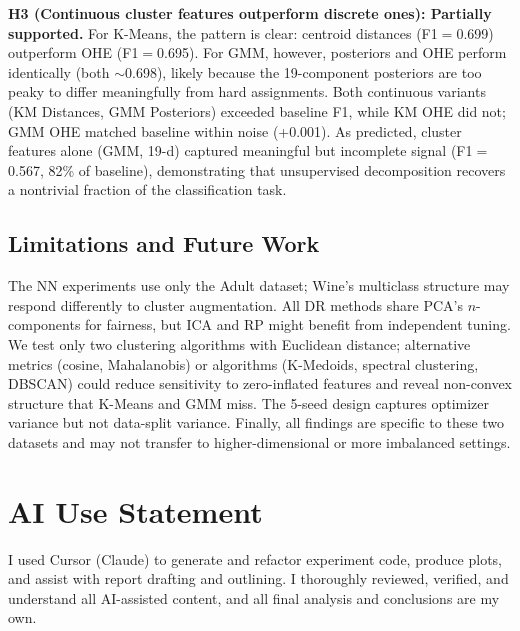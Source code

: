 \documentclass[conference]{IEEEtran}
\begin{document}
\textbf{H3 (Continuous cluster features outperform discrete ones):
Partially supported.} For K-Means, the pattern is clear: centroid
distances (F1$=$0.699) outperform OHE (F1$=$0.695). For GMM, however,
posteriors and OHE perform identically (both $\sim$0.698), likely
because the 19-component posteriors are too peaky to differ
meaningfully from hard assignments. Both continuous variants (KM
Distances, GMM Posteriors) exceeded baseline F1, while KM OHE did
not; GMM OHE matched baseline within noise (+0.001). As predicted,
cluster features alone (GMM, 19-d) captured meaningful but incomplete
signal (F1$=$0.567, 82\% of baseline), demonstrating that
unsupervised decomposition recovers a nontrivial fraction of the
classification task.

\subsection{Limitations and Future Work}

The NN experiments use only the Adult dataset; Wine's multiclass
structure may respond differently to cluster augmentation. All DR
methods share PCA's $n$-components for fairness, but ICA and RP might
benefit from independent tuning. We test only two clustering algorithms with Euclidean distance;
alternative metrics (cosine, Mahalanobis) or algorithms (K-Medoids,
spectral clustering, DBSCAN) could reduce sensitivity to
zero-inflated features and reveal non-convex structure that K-Means
and GMM miss. The 5-seed design captures
optimizer variance but not data-split variance. Finally, all findings
are specific to these two datasets and may not transfer to
higher-dimensional or more imbalanced settings.

\section{AI Use Statement}
I used Cursor (Claude) to generate and refactor experiment code, produce
plots, and assist with report drafting and outlining. I thoroughly reviewed,
verified, and understand all AI-assisted content, and all final analysis and
conclusions are my own.
\end{document}
